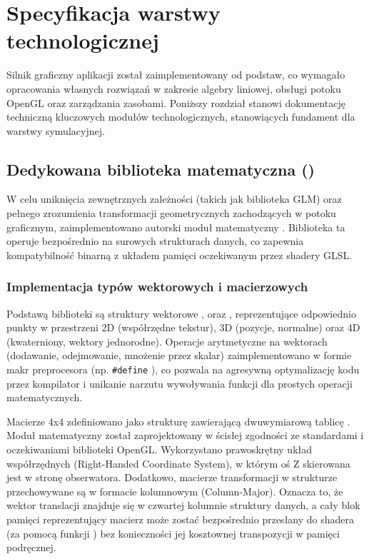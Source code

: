 \chapter{Specyfikacja warstwy technologicznej}
 Silnik graficzny aplikacji został zaimplementowany od podstaw, co wymagało opracowania własnych rozwiązań w zakresie algebry liniowej, obsługi potoku OpenGL oraz zarządzania zasobami. 
 Poniższy rozdział stanowi dokumentację techniczną kluczowych modułów technologicznych, stanowiących fundament dla warstwy symulacyjnej.

    \section{Dedykowana biblioteka matematyczna ()}
     W celu uniknięcia zewnętrznych zależności (takich jak biblioteka GLM) oraz pełnego zrozumienia transformacji geometrycznych zachodzących w potoku graficznym, zaimplementowano autorski moduł matematyczny  \cite{book_lengyel_math_3d}. 
     Biblioteka ta operuje bezpośrednio na surowych strukturach danych, co zapewnia kompatybilność binarną z układem pamięci oczekiwanym przez shadery GLSL.

        \subsection{Implementacja typów wektorowych i macierzowych}
         Podstawą biblioteki są struktury wektorowe ,  oraz , reprezentujące odpowiednio punkty w przestrzeni 2D (współrzędne tekstur), 3D (pozycje, normalne) oraz 4D (kwaterniony, wektory jednorodne).
         Operacje arytmetyczne na wektorach (dodawanie, odejmowanie, mnożenie przez skalar) zaimplementowano w formie makr preprocesora (np. \texttt{\#define} ), co pozwala na agresywną optymalizację kodu przez kompilator i unikanie narzutu wywoływania funkcji dla prostych operacji matematycznych.

         \bigbreak

         Macierze 4x4 zdefiniowano jako strukturę  zawierającą dwuwymiarową tablicę . Moduł matematyczny został zaprojektowany w ścisłej zgodności ze standardami i oczekiwaniami biblioteki OpenGL.
         Wykorzystano prawoskrętny układ współrzędnych (Right-Handed Coordinate System), w którym oś Z skierowana jest w stronę obserwatora. Dodatkowo, macierze transformacji w strukturze  przechowywane są w formacie kolumnowym (Column-Major). 
         Oznacza to, że wektor translacji znajduje się w czwartej kolumnie struktury danych, a cały blok pamięci reprezentujący macierz może zostać bezpośrednio przesłany do shadera (za pomocą funkcji ) bez konieczności jej kosztownej transpozycji w pamięci podręcznej.

